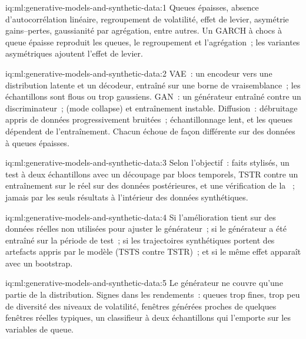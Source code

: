 \begin{solution}{iq:ml:generative-models-and-synthetic-data:1}
Queues épaisses, absence d'autocorrélation linéaire, regroupement de volatilité, effet de levier, asymétrie gains--pertes, gaussianité
par agrégation, entre autres. Un GARCH à chocs à queue épaisse reproduit les queues, le regroupement et l'agrégation~; les variantes asymétriques
ajoutent l'effet de levier.
\end{solution}

\begin{solution}{iq:ml:generative-models-and-synthetic-data:2}
VAE~: un encodeur vers une distribution latente et un décodeur, entraîné sur une borne de vraisemblance~; les échantillons sont flous ou trop gaussiens.
GAN~: un générateur entraîné contre un discriminateur~;  (mode collapse) et entraînement instable. Diffusion~: débruitage appris de
données progressivement bruitées~; échantillonnage lent, et les queues dépendent de l'entraînement. Chacun échoue de façon différente sur des données à queues épaisses.
\end{solution}

\begin{solution}{iq:ml:generative-models-and-synthetic-data:3}
Selon l'objectif~: faits stylisés, un test à deux échantillons avec un découpage par blocs temporels, TSTR contre un entraînement sur le réel sur des données postérieures, et une
vérification de la ~; jamais par les seuls résultats à l'intérieur des données synthétiques.
\end{solution}

\begin{solution}{iq:ml:generative-models-and-synthetic-data:4}
Si l'amélioration tient sur des données réelles non utilisées pour ajuster le générateur~; si le générateur a été entraîné sur la
période de test~; si les trajectoires synthétiques portent des artefacts appris par le modèle (TSTS contre TSTR)~; et si le même effet apparaît
avec un bootstrap.
\end{solution}

\begin{solution}{iq:ml:generative-models-and-synthetic-data:5}
Le générateur ne couvre qu'une partie de la distribution. Signes dans les rendements~: queues trop fines, trop peu de diversité des
niveaux de volatilité, fenêtres générées proches de quelques fenêtres réelles typiques, un classifieur à deux échantillons qui l'emporte sur les variables de queue.
\end{solution}

